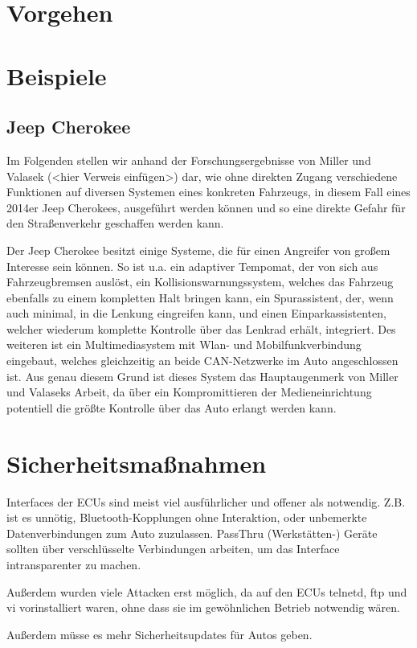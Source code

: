 \documentclass[
    fontsize=12pt,
    headings=small,
    parskip=half,           %
    bibliography=totoc,9
    numbers=noenddot,       %
    open=any,               %
    ]{scrreprt}
\begin{document}
\section{Vorgehen}
\section{Beispiele}
\subsection{Jeep Cherokee}
Im Folgenden stellen wir anhand der Forschungsergebnisse von Miller und Valasek (<hier Verweis einfügen>) dar, wie ohne direkten Zugang verschiedene Funktionen auf diversen Systemen eines konkreten Fahrzeugs, in diesem Fall eines 2014er Jeep Cherokees, ausgeführt werden können und so eine direkte Gefahr für den Straßenverkehr geschaffen werden kann. \par
Der Jeep Cherokee besitzt einige Systeme, die für einen Angreifer von großem Interesse sein können. So ist u.a. ein adaptiver Tempomat, der von sich aus Fahrzeugbremsen auslöst, ein Kollisionswarnungssystem, welches das Fahrzeug ebenfalls zu einem kompletten Halt bringen kann, ein Spurassistent, der, wenn auch minimal, in die Lenkung eingreifen kann, und einen Einparkassistenten, welcher wiederum komplette Kontrolle über das Lenkrad erhält, integriert. Des weiteren ist ein Multimediasystem mit Wlan- und Mobilfunkverbindung eingebaut, welches gleichzeitig an beide CAN-Netzwerke im Auto angeschlossen ist. Aus genau diesem Grund ist dieses System das Hauptaugenmerk von Miller und Valaseks Arbeit, da über ein Kompromittieren der Medieneinrichtung potentiell die größte Kontrolle über das Auto erlangt werden kann.

\section{Sicherheitsmaßnahmen}

Interfaces der ECUs sind meist viel ausführlicher und offener als notwendig. Z.B. ist es unnötig, Bluetooth-Kopplungen ohne Interaktion, oder unbemerkte Datenverbindungen zum Auto zuzulassen. PassThru (Werkstätten-) Geräte sollten über verschlüsselte Verbindungen arbeiten, um das Interface intransparenter zu machen.\par
Außerdem wurden viele Attacken erst möglich, da auf den ECUs telnetd, ftp und vi vorinstalliert waren, ohne dass sie im gewöhnlichen Betrieb notwendig wären. \par
Außerdem müsse es mehr Sicherheitsupdates für Autos geben.
\end{document}
